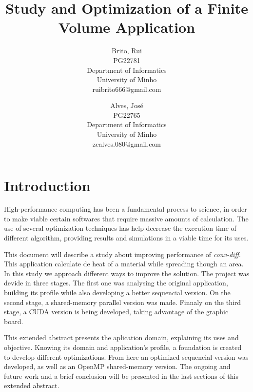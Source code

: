 \documentclass[a4paper,10pt,openright,openbib,twocolumn]{article}
\begin{document}
\begin{multicols}{2}
\title{Study and Optimization of a Finite Volume Application}
\author{
    Brito, Rui\\
    PG22781\\
    Department of Informatics\\
    University of Minho\\
    ruibrito666@gmail.com
  \and
    Alves, José\\
    PG22765\\
    Department of Informatics\\
    University of Minho\\
    zealves.080@gmail.com
}
\date{}
\maketitle
\end{multicols}

\section{Introduction}

High-performance computing has been a fundamental process to science, in order to make viable certain softwares that require massive amounts of calculation. The use of several optimization techniques has help decrease the execution time of different algorithm, providing results and simulations in a viable time for its uses.

This document will describe a study about improving performance of \emph{conv-diff}. This application calculate de heat of a material while spreading though an area. In this study we approach different ways to improve the solution. The project was devide in three stages. The first one was analysing the original application, building its profile while also developing a better sequencial version. 
On the second stage, a shared-memory parallel version was made. Finnaly on the third stage, a CUDA version is being developed, taking advantage of the graphic board.

This extended abstract presents the aplication domain, explaining its uses and objective. Knowing its domain and application's profile, a foundation is created to develop different optimizations. From here an optimized sequencial version was developed, as well as an OpenMP shared-memory version. The ongoing and future work and a brief conclusion will be presented in the last sections of this extended abstract.
\end{document}
